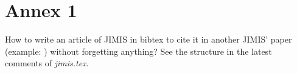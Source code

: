 \documentclass{jimis}
\begin{document}



\appendix\footnotesize

\section{Annex 1}
How to write an article of JIMIS in bibtex to cite it in another JIMIS' paper (example: \citet{jimis}) without forgetting anything? See the structure in the latest comments of \textit{jimis.tex}.

 
\end{document}

